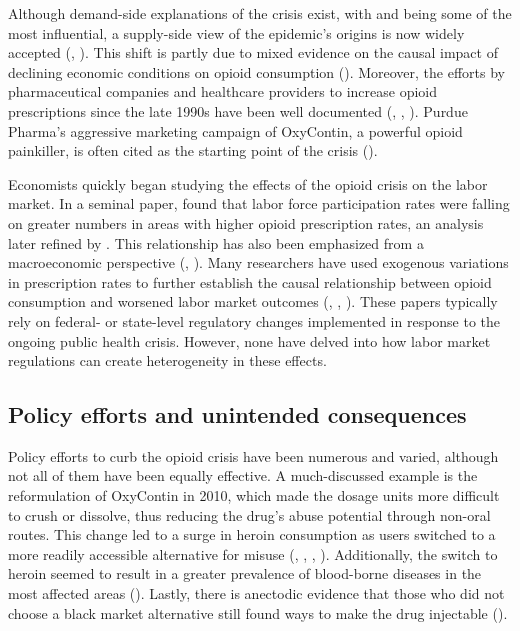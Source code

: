 \documentclass[12pt,a4paper]{article}
\begin{document}
Although demand-side explanations of the crisis exist, with \textcite{Deaton2017} and \textcite{Deaton2015} being some of the most influential, a supply-side view of the epidemic's origins is now widely accepted (\cite{Eichmeyer2022}, \cite{Ruhm2018}). 
This shift is partly due to mixed evidence on the causal impact of declining economic conditions on opioid consumption (\cite{Currie2018}).
Moreover, the efforts by pharmaceutical companies and healthcare providers to increase opioid prescriptions since the late 1990s have been well documented (\cite{Alpert2019}, \cite{Kolodny2015}, \cite{VanZee2008}).
Purdue Pharma's aggressive marketing campaign of OxyContin, a powerful opioid painkiller, is often cited as the starting point of the crisis (\cite{Chow2019}).

Economists quickly began studying the effects of the opioid crisis on the labor market.
In a seminal paper, \textcite{Krueger2017} found that labor force participation rates were falling on greater numbers in areas with higher opioid prescription rates, an analysis later refined by \textcite{Aliprantis2023}.
This relationship has also been emphasized from a macroeconomic perspective (\cite{Greenwood2022a}, \cite{Greenwood2022b}).
Many researchers have used exogenous variations in prescription rates to further establish the causal relationship between opioid consumption and worsened labor market outcomes (\cite{Beheshti2023}, \cite{Powell2022}, \cite{Harris2020}).
These papers typically rely on federal- or state-level regulatory changes implemented in response to the ongoing public health crisis.
However, none have delved into how labor market regulations can create heterogeneity in these effects.

\subsection*{Policy efforts and unintended consequences}

Policy efforts to curb the opioid crisis have been numerous and varied, although not all of them have been equally effective.
A much-discussed example is the reformulation of OxyContin in 2010, which made the dosage units more difficult to crush or dissolve, thus reducing the drug's abuse potential through non-oral routes.
This change led to a surge in heroin consumption as users switched to a more readily accessible alternative for misuse (\cite{Alpert2018}, \cite{Evans2019}, \cite{Cicero2012}, \cite{Butler2013}).
Additionally, the switch to heroin seemed to result in a greater prevalence of blood-borne diseases in the most affected areas (\cite{Beheshti2019}).
Lastly, there is anectodic evidence that those who did not choose a black market alternative still found ways to make the drug injectable (\cite{Cicero2015}).
\end{document}
